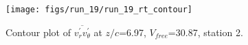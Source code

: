 \begin{figure}[H]
\centering
\texttt{[image: figs/run\_19/run\_19\_rt\_contour]}
\caption{Contour plot of $\overline{v_{r}^{\prime} v_{\theta}^{\prime}}$ at $z/c$=6.97, $V_{free}$=30.87, station 2.}
\label{fig:run_19_rt_contour}
\end{figure}


